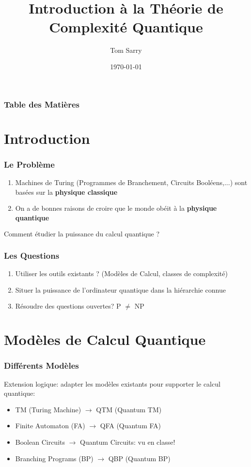 \documentclass{beamer}
\title[Th\'eorie de la Complexit\'e Quantique]{Introduction \`a la Th\'eorie de Complexit\'e Quantique}
\author{Tom Sarry}
\institute[UdeM]{Universit\'e de Montr\'eal}
\date[]{\today}
\begin{document}
\frame{\titlepage}

\begin{frame}
  \frametitle{Table des Mati\`eres}
  \tableofcontents
\end{frame}


\section{Introduction}

\begin{frame}
  \frametitle{Le Probl\`eme}

  \begin{enumerate}
    \item Machines de Turing (Programmes de Branchement, Circuits Bool\'eens,...) sont bas\'ees sur la \textbf{physique classique}
    \item On a de bonnes raisons de croire que le monde ob\'eit \`a la \textbf{physique quantique}
  \end{enumerate}
  Comment \'etudier la puissance du calcul quantique ?
\end{frame}

\begin{frame}
  \frametitle{Les Questions}

  \begin{enumerate}
    \item Utiliser les outils existants ? (Mod\`eles de Calcul, classes de complexit\'e)
    \item Situer la puissance de l'ordinateur quantique dans la hi\'erarchie connue
    \item R\'esoudre des questions ouvertes? \pause \textsf{P} $\neq$ \textsf{NP}
  \end{enumerate}
\end{frame}

\section{Mod\`eles de Calcul Quantique}

\begin{frame}
  \frametitle{Diff\'erents Mod\`eles}

  Extension logique: adapter les mod\`eles existants pour supporter le calcul quantique:
  \begin{itemize}
    \item TM (Turing Machine) $\rightarrow$ QTM (Quantum TM)
    \item Finite Automaton (FA) $\rightarrow$ QFA (Quantum FA)
    \item Boolean Circuits $\rightarrow$ Quantum Circuits: vu en classe!
    \item Branching Programs (BP) $\rightarrow$ QBP (Quantum BP)
  \end{itemize}
\end{frame}
\end{document}
